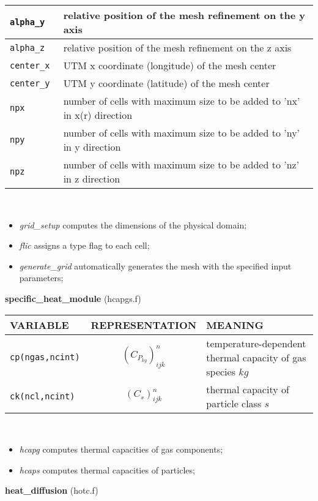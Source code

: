 \begin{tabular}{|p{6cm}|p{6cm}|}
\tt alpha\_y    & relative position of the mesh refinement on the y axis\\ \hline
\tt alpha\_z    & relative position of the mesh refinement on the z axis \\ \hline
\tt center\_x    & UTM x coordinate (longitude) of the mesh center \\ \hline
\tt center\_y    & UTM y coordinate (latitude) of the mesh center \\ \hline
\tt npx    & number of cells with maximum size to be added to 'nx' in x(r) direction \\ \hline
\tt npy    & number of cells with maximum size to be added to 'ny' in y direction \\ \hline
\tt npz    & number of cells with maximum size to be added to 'nz' in z direction\\ \hline
\end{tabular}\\[5mm]
\begin{itemize}
\item{\em grid\_setup} computes the dimensions of the physical domain;
\item{\em flic} assigns a type flag to each cell;
\item{\em generate\_grid} automatically generates the mesh with the specified input parameters;
\end{itemize}
%
%
{\large{\bf specific\_heat\_module}} (hcapgs.f)\\[5mm]
\begin{tabular}{|p{6cm}|c|p{6cm}|}\hline
VARIABLE & REPRESENTATION & MEANING\\\hline
\tt cp(ngas,ncint) & $(C_{P_{kg}})^n_{ijk}$ & temperature-dependent thermal capacity of gas species $kg$\\\hline
\tt ck(ncl,ncint) & $(C_s)^n_{ijk}$ & thermal capacity of particle class $s$\\\hline
\end{tabular}\\
\begin{itemize}
\item{\em hcapg} computes thermal capacities of gas components;
\item{\em hcaps} computes thermal capacities of particles;
\end{itemize}
%
%
{\large{\bf heat\_diffusion}} (hotc.f)\\
